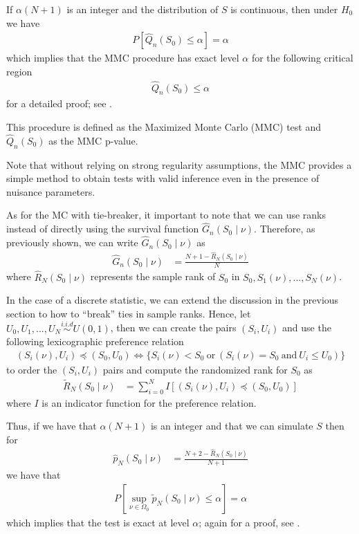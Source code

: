 \documentclass[]{article}\usepackage[]{graphicx}\usepackage[]{color}
\begin{document}
If $\alpha(N+1)$ is an integer and the distribution of $S$ is continuous, then under $H_0$ we have
\begin{align}
P [\hat{Q}_n(S_0) \leq \alpha] = \alpha
\end{align}
which implies that the MMC procedure has exact level $\alpha$ for the following critical region
\begin{align}
	\hat{Q}_n(S_0) \leq \alpha
\end{align}
for a detailed proof; see \cite{dufour_monte_2006}.

This procedure is defined as the Maximized Monte Carlo (MMC) test and $\hat{Q}_n(S_0)$ as the MMC p-value.

Note that without relying on strong regularity assumptions, the MMC provides a simple method to obtain tests with valid inference even in the presence of nuisance parameters.

As for the MC with tie-breaker, it important to note that we can use ranks instead of directly using the survival function $\hat{G}_{n}(S_{0} \mid \nu)$. Therefore, as previously shown, we can write $\hat{G}_{n}(S_{0} \mid \nu)$ as
\begin{align}
\hat{G}_{n}(S_{0} \mid \nu) &= \frac{N+1-\hat{R}_N(S_0 \mid \nu)}{N}
\end{align}
where $\hat{R}_N(S_0 \mid \nu)$ represents the sample rank of $S_0$ in $S_0, S_1(\nu),...,S_N(\nu)$.

In the case of a discrete statistic, we can extend the discussion in the previous section to how to ``break'' ties in sample ranks. Hence, let $U_0, U_1,...,U_N \overset{i.i.d}{\sim} U(0,1)$, then we can create the pairs $(S_i,U_i)$ and use the following lexicographic preference relation
\begin{align}
 	(S_i(\nu),U_i) \preccurlyeq (S_0,U_0) \Longleftrightarrow \{ S_i(\nu)<S_0 \ \mathrm{or} \ ( S_i(\nu) = S_0 \ \mathrm{and} \ U_i \leq U_0 ) \}
\end{align}
 to order the $(S_i,U_i)$ pairs and compute the randomized rank for $S_0$ as
 \begin{align}
 	\tilde{R}_{N}(S_0\mid \nu) & = \sum_{i=0}^{N}I[(S_i(\nu),U_i) \preccurlyeq (S_0,U_0)]
 \end{align}
 where $I$ is an indicator function for the preference relation.

Thus, if we have that $\alpha(N+1)$ is an integer and that we can simulate $S$ then for
\begin{align}
\hat{p}_{N}(S_{0} \mid \nu) & = \frac{N + 2 -\hat{R}_N(S_0 \mid \nu)}{N+1}
\end{align}
we have that
\begin{align}
P [\sup_{\nu \in \Omega_0} \tilde{p}_{N}(S_{0} \mid \nu) \leq \alpha] = \alpha
\end{align}
which implies that the test is exact at level $\alpha$; again for a proof, see \cite{dufour_monte_2006}.
\end{document}

